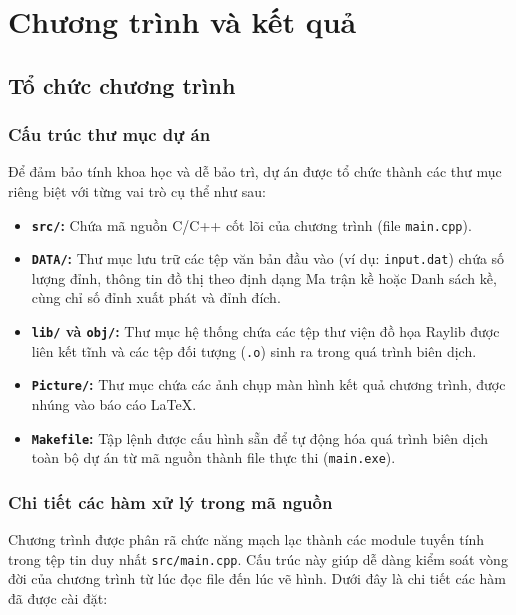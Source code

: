 \documentclass[12pt,a4paper,oneside]{report}
\begin{document}
\chapter{Chương trình và kết quả}

\section{Tổ chức chương trình}
\subsection{Cấu trúc thư mục dự án}
Để đảm bảo tính khoa học và dễ bảo trì, dự án được tổ chức thành các thư mục riêng biệt với từng vai trò cụ thể như sau:
\begin{itemize}
    \item \textbf{\texttt{src/}:} Chứa mã nguồn C/C++ cốt lõi của chương trình (file \texttt{main.cpp}).
    \item \textbf{\texttt{DATA/}:} Thư mục lưu trữ các tệp văn bản đầu vào (ví dụ: \texttt{input.dat}) chứa số lượng đỉnh, thông tin đồ thị theo định dạng Ma trận kề hoặc Danh sách kề, cùng chỉ số đỉnh xuất phát và đỉnh đích.
    \item \textbf{\texttt{lib/} và \texttt{obj/}:} Thư mục hệ thống chứa các tệp thư viện đồ họa Raylib được liên kết tĩnh và các tệp đối tượng (\texttt{.o}) sinh ra trong quá trình biên dịch.
    \item \textbf{\texttt{Picture/}:} Thư mục chứa các ảnh chụp màn hình kết quả chương trình, được nhúng vào báo cáo LaTeX.
    \item \textbf{\texttt{Makefile}:} Tập lệnh được cấu hình sẵn để tự động hóa quá trình biên dịch toàn bộ dự án từ mã nguồn thành file thực thi (\texttt{main.exe}).
\end{itemize}

\subsection{Chi tiết các hàm xử lý trong mã nguồn}
Chương trình được phân rã chức năng mạch lạc thành các module tuyến tính trong tệp tin duy nhất \texttt{src/main.cpp}. Cấu trúc này giúp dễ dàng kiểm soát vòng đời của chương trình từ lúc đọc file đến lúc vẽ hình. Dưới đây là chi tiết các hàm đã được cài đặt:
\end{document}
